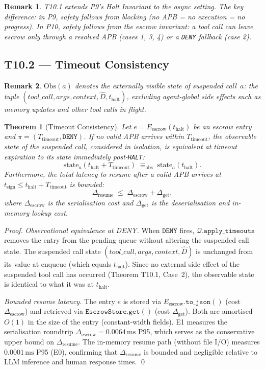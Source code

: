 \documentclass[11pt]{article}
\newtheorem{theorem}{Theorem}[section]
\newtheorem{remark}{Remark}[section]
\newcommand{\Dhat}{\widehat{D}}
\newcommand{\HALT}{\texttt{HALT}}
\newcommand{\DENY}{\texttt{DENY}}
\newcommand{\Eescrow}{E_{\mathrm{escrow}}}
\newcommand{\thalt}{t_{\mathrm{halt}}}
\newcommand{\tsign}{t_{\mathrm{sign}}}
\newcommand{\Ttimeout}{T_{\mathrm{timeout}}}
\newcommand{\Drescrow}{\Delta_{\mathrm{escrow}}}
\newcommand{\Dresume}{\Delta_{\mathrm{resume}}}
\newcommand{\Queue}{\mathcal{Q}}
\begin{document}
\begin{remark}
T10.1 extends P9's Halt Invariant to the async setting. The key
difference: in P9, safety follows from blocking (no APB = no
execution = no progress). In P10, safety follows from the escrow
invariant: a tool call can leave escrow only through a resolved APB
(cases 1, 3, 4) or a \DENY{} fallback (case 2).
\end{remark}

\subsection{T10.2 --- Timeout Consistency}

\begin{remark}
$\mathrm{Obs}(a)$ denotes the externally visible state of suspended
call~$a$: the tuple $(\mathit{tool\_call}, \mathit{args},
\mathit{context}, \Dhat, \thalt)$, excluding agent-global side
effects such as memory updates and other tool calls in flight.
\end{remark}

\begin{theorem}[Timeout Consistency]
\label{thm:timeout}
Let $e = \Eescrow(\thalt)$ be an escrow entry and $\pi = (\Ttimeout, \DENY)$.
If no valid APB arrives within $\Ttimeout$, the observable state of the
\emph{suspended call, considered in isolation}, is equivalent at
timeout expiration to its state immediately post-\HALT{}:
\[
  \mathrm{state}_{a}(\thalt + \Ttimeout)
  \;\equiv_{\mathrm{obs}}\;
  \mathrm{state}_{a}(\thalt).
\]
Furthermore, the total latency to resume after a valid APB arrives at
$\tsign \le \thalt + \Ttimeout$ is bounded:
\[
  \Dresume \;\le\; \Drescrow + \Delta_{\mathrm{get}},
\]
where $\Drescrow$ is the serialisation cost and $\Delta_{\mathrm{get}}$
is the deserialisation and in-memory lookup cost.
\end{theorem}

\begin{proof}
\emph{Observational equivalence at DENY.}
When $\DENY$ fires, $\Queue.\mathtt{apply\_timeouts}$ removes the entry
from the pending queue without altering the suspended call state. The
suspended call state $(\mathit{tool\_call}, \mathit{args},
\mathit{context}, \Dhat)$ is unchanged from its value at enqueue (which
equals $\thalt$). Since no external side effect of the suspended tool
call has occurred (Theorem T10.1, Case~2), the observable state is
identical to what it was at $\thalt$.

\emph{Bounded resume latency.}
The entry $e$ is stored via $\Eescrow.\mathtt{to\_json}()$ (cost
$\Drescrow$) and retrieved via $\mathtt{EscrowStore.get}()$ (cost
$\Delta_{\mathrm{get}}$). Both are amortised $O(1)$ in the size of the
entry (constant-width fields). E1 measures the serialisation roundtrip
$\Drescrow = 0.0064\,\si{\milli\second}$ P95, which serves as the
conservative upper bound on $\Dresume$. The in-memory resume path
(without file I/O) measures $0.0001\,\si{\milli\second}$ P95 (E0),
confirming that $\Dresume$ is bounded and negligible relative to LLM
inference and human response times.
\qed
\end{proof}
\end{document}

